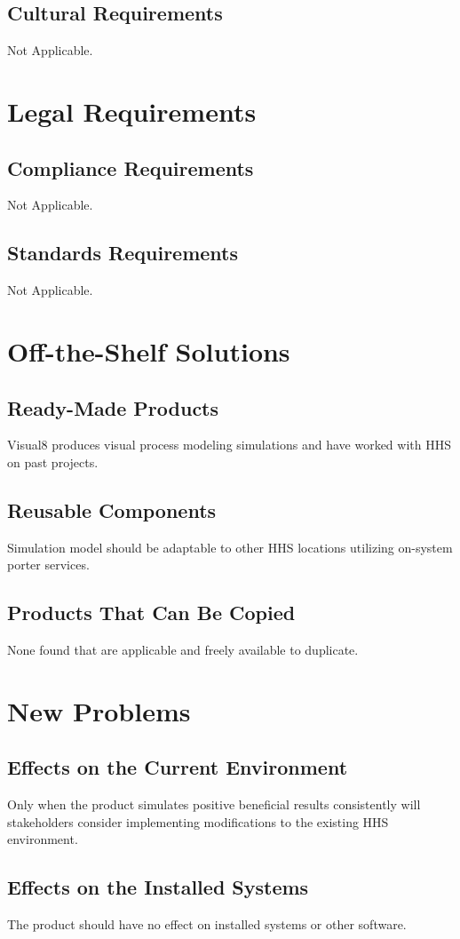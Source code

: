\documentclass[paper=letter, fontsize=10pt]{scrartcl}
\numberwithin{equation}{section}		%
\numberwithin{figure}{section}			%
\numberwithin{table}{section}				%
\begin{document}
\subsection{Cultural Requirements}
Not Applicable.

\section{Legal Requirements}
\subsection{Compliance Requirements}
Not Applicable.
\subsection{Standards Requirements}
Not Applicable.

\section{Off-the-Shelf Solutions}
\subsection{Ready-Made Products}
Visual8 produces visual process modeling simulations and have worked with HHS on past projects.
\subsection{Reusable Components}
Simulation model should be adaptable to other HHS locations utilizing on-system porter services.
\subsection{Products That Can Be Copied}
None found that are applicable and freely available to duplicate.

\section{New Problems}
\subsection{Effects on the Current Environment}
Only when the product simulates positive beneficial results consistently will stakeholders consider implementing modifications to the existing HHS environment.
\subsection{Effects on the Installed Systems}
The product should have no effect on installed systems or other software.
\end{document}
